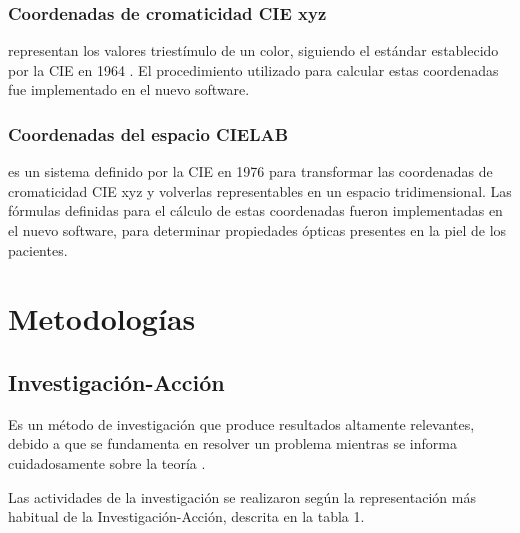 \documentclass[conference]{IEEEtran}
\begin{document}
		\subsubsection{Coordenadas de cromaticidad CIE xyz}
		representan los valores triest\'{i}mulo de un color, siguiendo el est\'{a}ndar establecido por la CIE en 1964 \cite{CIE}. El procedimiento utilizado para calcular estas coordenadas \cite{Schanda} fue implementado en el nuevo software.

		\subsubsection{Coordenadas del espacio CIELAB}
		es un sistema definido por la CIE en 1976 \cite{CIE} para transformar las coordenadas de cromaticidad CIE xyz y volverlas representables en un espacio tridimensional. Las f\'{o}rmulas definidas para el c\'{a}lculo de estas coordenadas \cite{Schanda} fueron implementadas en el nuevo software, para determinar propiedades \'{o}pticas presentes en la piel de los pacientes.

\section{Metodolog\'{i}as}

	\subsection{Investigaci\'{o}n-Acci\'{o}n}
		Es un m\'{e}todo de investigaci\'{o}n que produce resultados altamente relevantes, debido a que se fundamenta en resolver un problema mientras se informa cuidadosamente sobre la teor\'{i}a \cite{Baskerville}.

		Las actividades de la investigaci\'{o}n se realizaron seg\'{u}n la representaci\'{o}n m\'{a}s habitual de la Investigaci\'{o}n-Acci\'{o}n, descrita en la tabla 1.
\end{document}
